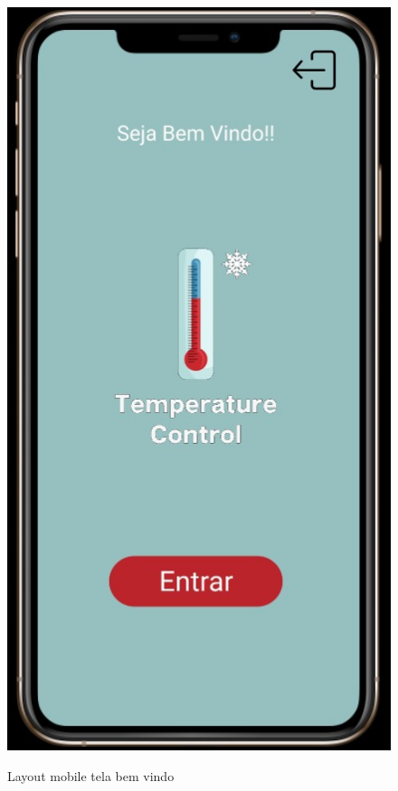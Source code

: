     \begin{figure}[htb!]
        \caption{Layout mobile tela bem vindo}
        \centering
        \includegraphics[scale=0.5]{img/mobile/bem_vindo.png}
        \label{fig:mobileBemVindo}
    \end{figure}

